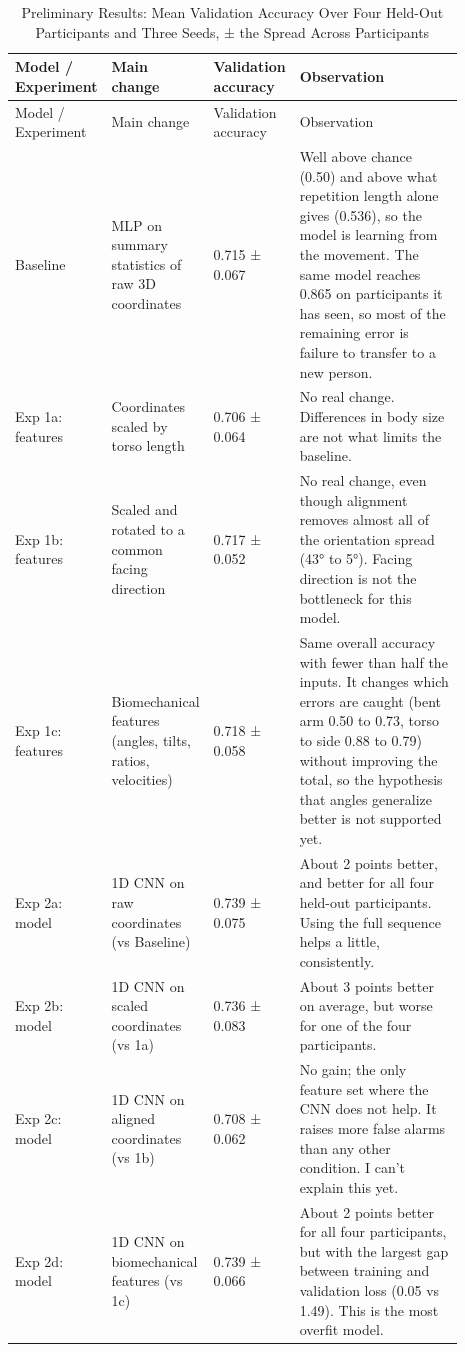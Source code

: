 \begin{longtable}{L{0.17\linewidth} L{0.22\linewidth} L{0.12\linewidth} L{0.38\linewidth}}
\caption{Preliminary Results: Mean Validation Accuracy Over Four Held-Out Participants and Three Seeds, ± the Spread Across Participants}\\
\toprule
Model / Experiment & Main change & Validation accuracy & Observation \\
\midrule
\endfirsthead
\toprule
Model / Experiment & Main change & Validation accuracy & Observation \\
\midrule
\endhead
\bottomrule
\endlastfoot
Baseline & MLP on summary statistics of raw 3D coordinates & 0.715 ± 0.067 & Well above chance (0.50) and above what repetition length alone gives (0.536), so the model is learning from the movement. The same model reaches 0.865 on participants it has seen, so most of the remaining error is failure to transfer to a new person. \\
Exp 1a: features & Coordinates scaled by torso length & 0.706 ± 0.064 & No real change. Differences in body size are not what limits the baseline. \\
Exp 1b: features & Scaled and rotated to a common facing direction & 0.717 ± 0.052 & No real change, even though alignment removes almost all of the orientation spread (43° to 5°). Facing direction is not the bottleneck for this model. \\
Exp 1c: features & Biomechanical features (angles, tilts, ratios, velocities) & 0.718 ± 0.058 & Same overall accuracy with fewer than half the inputs. It changes which errors are caught (bent arm 0.50 to 0.73, torso to side 0.88 to 0.79) without improving the total, so the hypothesis that angles generalize better is not supported yet. \\
Exp 2a: model & 1D CNN on raw coordinates (vs Baseline) & 0.739 ± 0.075 & About 2 points better, and better for all four held-out participants. Using the full sequence helps a little, consistently. \\
Exp 2b: model & 1D CNN on scaled coordinates (vs 1a) & 0.736 ± 0.083 & About 3 points better on average, but worse for one of the four participants. \\
Exp 2c: model & 1D CNN on aligned coordinates (vs 1b) & 0.708 ± 0.062 & No gain; the only feature set where the CNN does not help. It raises more false alarms than any other condition. I can't explain this yet. \\
Exp 2d: model & 1D CNN on biomechanical features (vs 1c) & 0.739 ± 0.066 & About 2 points better for all four participants, but with the largest gap between training and validation loss (0.05 vs 1.49). This is the most overfit model. \\
\end{longtable}

